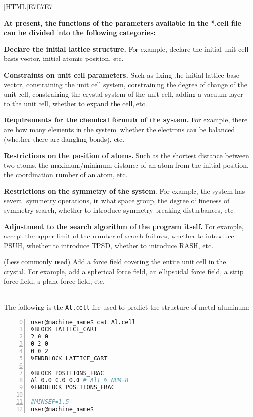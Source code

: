 \documentclass[a4paper, 10pt]{article}
\begin{document}
\noindent{}[HTML]{E7E7E7}{\parbox{\textwidth}{%
\noindent \textbf{At present, the functions of the parameters available in the *.cell file can be divided into the following categories:}
\begin{maineu}
  \item \textbf{Declare the initial lattice structure.} For example, declare the initial unit cell basis vector, initial atomic position, etc.
  \item \textbf{Constraints on unit cell parameters.} Such as fixing the initial lattice base vector, constraining the unit cell system, constraining the degree of change of the unit cell, constraining the crystal system of the unit cell, adding a vacuum layer to the unit cell, whether to expand the cell, etc.
  \item \textbf{Requirements for the chemical formula of the system.} For example, there are how many elements in the system, whether the electrons can be balanced (whether there are dangling bonds), etc.
  \item\textbf{Restrictions on the position of atoms.} Such as the shortest distance between two atoms, the maximum/minimum distance of an atom from the initial position, the coordination number of an atom, etc.
  \item \textbf{Restrictions on the symmetry of the system.} For example, the system has several symmetry operations, in what space group, the degree of fineness of symmetry search, whether to introduce symmetry breaking disturbances, etc.
  \item \textbf{Adjustment to the search algorithm of the program itself.} For example, accept the upper limit of the number of search failures, whether to introduce PSUH, whether to introduce TPSD, whether to introduce RASH, etc.
  \item (Less commonly used) Add a force field covering the entire unit cell in the crystal. For example, add a spherical force field, an ellipsoidal force field, a strip force field, a plane force field, etc.
\end{maineu}}}\\

The following is the \verb|Al.cell| file used to predict the structure of metal aluminum:
\begin{lstlisting}[language={bash},numbers=left,firstnumber=0]
user@machine_name$ cat Al.cell
%BLOCK LATTICE_CART
2 0 0
0 2 0
0 0 2 
%ENDBLOCK LATTICE_CART

%BLOCK POSITIONS_FRAC
Al 0.0 0.0 0.0 # Al1 % NUM=8
%ENDBLOCK POSITIONS_FRAC

#MINSEP=1.5
user@machine_name$
\end{lstlisting}
\end{document}
